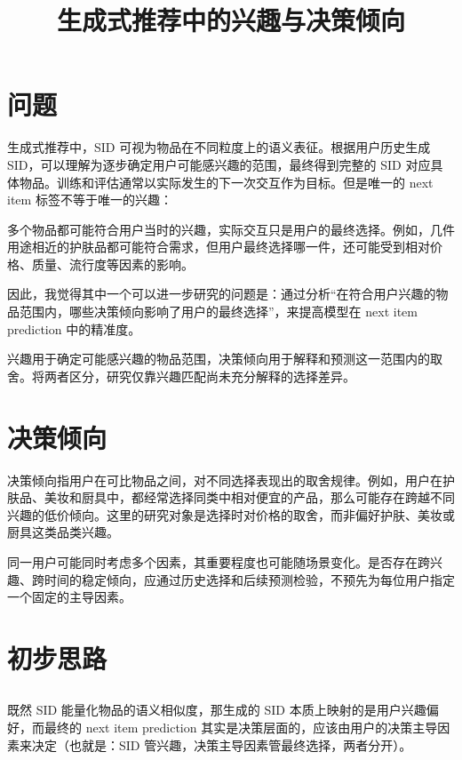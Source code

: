 \documentclass[UTF8,a4paper,zihao=-4,fontset=fandol]{ctexart}
\title{\vspace{-1.5cm}\textbf{生成式推荐中的兴趣与决策倾向}}
\author{}
\date{}
\begin{document}
\maketitle
\vspace{-1.6cm}

\section{问题}

生成式推荐中，SID 可视为物品在不同粒度上的语义表征。根据用户历史生成 SID，可以理解为逐步确定用户可能感兴趣的范围，最终得到完整的 SID 对应具体物品。训练和评估通常以实际发生的下一次交互作为目标。但是唯一的 next item 标签不等于唯一的兴趣：

多个物品都可能符合用户当时的兴趣，实际交互只是用户的最终选择。例如，几件用途相近的护肤品都可能符合需求，但用户最终选择哪一件，还可能受到相对价格、质量、流行度等因素的影响。

因此，我觉得其中一个可以进一步研究的问题是：通过分析“在符合用户兴趣的物品范围内，哪些决策倾向影响了用户的最终选择”，来提高模型在 next item prediction 中的精准度。

兴趣用于确定可能感兴趣的物品范围，决策倾向用于解释和预测这一范围内的取舍。将两者区分，研究仅靠兴趣匹配尚未充分解释的选择差异。

\section{决策倾向}

决策倾向指用户在可比物品之间，对不同选择表现出的取舍规律。例如，用户在护肤品、美妆和厨具中，都经常选择同类中相对便宜的产品，那么可能存在跨越不同兴趣的低价倾向。这里的研究对象是选择时对价格的取舍，而非偏好护肤、美妆或厨具这类品类兴趣。

同一用户可能同时考虑多个因素，其重要程度也可能随场景变化。是否存在跨兴趣、跨时间的稳定倾向，应通过历史选择和后续预测检验，不预先为每位用户指定一个固定的主导因素。

\section{初步思路}
\subsection{}
既然 SID 能量化物品的语义相似度，那生成的 SID 本质上映射的是用户兴趣偏好，而最终的 next item prediction 其实是决策层面的，应该由用户的决策主导因素来决定（也就是：SID 管兴趣，决策主导因素管最终选择，两者分开）。
\end{document}
